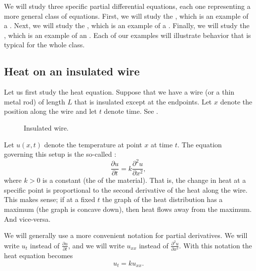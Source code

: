 We will study three specific
partial differential equations, each one representing a
more general class of equations.  First, we will study the
\emph{}, which is an example of
a \emph{}.  Next, we will study the
\emph{}, which is an example of
a \emph{}.  Finally, we will study the
\emph{}, which is an example of
an \emph{}.  Each of our examples will illustrate
behavior that is typical for the whole class.

\subsection{Heat on an insulated wire}

Let us first study the heat equation.
Suppose that we have a wire (or a thin metal rod) of length $L$
that is insulated
except at the
endpoints.  Let $x$ denote the position along the wire and let $t$ denote
time.  See .

\begin{figure}[h!t]
\capstart
\begin{center}
\caption{Insulated wire.\label{heat:wirefig}}
\end{center}
\end{figure}

Let $u(x,t)$ denote the temperature at point $x$ at time $t$.
The equation governing this setup is the
so-called \emph{}:
\begin{equation*}
\boxed{~~
\frac{\partial u}{\partial t} =
k \frac{\partial^2 u}{\partial x^2} ,
~~}
\end{equation*}
where $k > 0$ is a constant (the \emph{} of the material).
That is, the change in heat at a specific point is proportional to the second
derivative of the heat along the wire.  This makes sense;
if at a fixed $t$
the graph of the heat distribution has a maximum (the graph is concave down),
then heat flows away from the maximum.  And vice-versa.

We will generally use a more convenient notation for partial derivatives.
We will write $u_t$ instead of $\frac{\partial u}{\partial t}$,
and we will write $u_{xx}$ instead of $\frac{\partial^2 u}{\partial x^2}$.
With this notation the heat equation becomes
\begin{equation*}
u_t = k u_{xx} .
\end{equation*}

